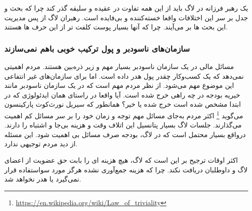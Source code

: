 یک رهبر فرزانه در لاگ باید از این همه تفاوت در عقیده و سلیقه گذر کند چرا که بحث و جدل
بر سر این اختلافات واقعا خسته‌کننده و بی‌فایده است. رهبران لاگ از پس مدیریت این بحث ها 
بر می‌آیند. چرا که آنها بسیار پوست کلفت تر از این حرف ها هستند.

\subsubsection{سازمان‌های ناسودبر و پول ترکیب خوبی باهم نمی‌سازند}

مسائل مالی در یک سازمان ناسودبر بسیار مهم و زیر ذره‌بین هستند. مردم اهمیتی نمی‌دهد
که یک کسب‌وکار چقدر پول هدر داده است. اما برای سازمان‌های غیر انتفاعی این موضوع مهم می‌شود.
از نظر مردم مهم است که در یک سازمان ناسودبر مانند خیریه بودجه در چه راهی خرج شده است.
آیا واقعا در راستای همان ایدئولوژی که در ابتدا مشخص شده است خرج شده یا خیر؟
همانطور که سیریل نورث‌کوت پارکینسون می‌گوید
\footnote{\url{https://en.wikipedia.org/wiki/Law_of_triviality}}
اکثر مردم به‌جای مسائل مهم توجه و زمان خود را بر سر مسائل کم اهمیت می‌گذارند.
جلسات لاگ بسیار پتانسیل این اتلاف وقت و هزینه بی‌جا و اشتباه را دارند. درواقع بسیار محتمل است
که در لاگ، بودجه صرف مسائل بی اهمیت شود. این مسئله از دید مردم توجیهی ندارد.

اکثر اوقات ترجیح بر این است که لاگ، هیچ هزینه ای را بابت حق عضویت از اعضای لاگ و داوطلبان دریافت نکند.
چرا که هزینه جمع‌آوری نشده هرگز مورد سواستفاده قرار نمی‌گیرد یا هدر نخواهد شد.

